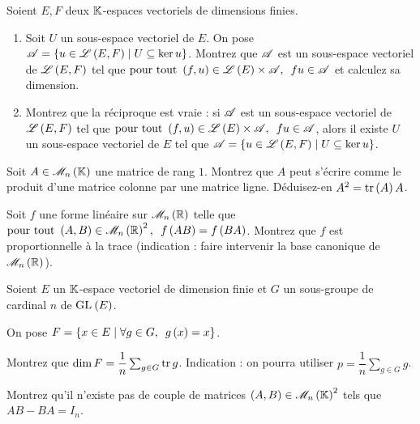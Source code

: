 \begin{exoss}[Exercice 20]
Soient \(E,F\) deux \(\mathbb{K}\)-espaces vectoriels de dimensions finies.

\begin{enumerate}
    \item Soit \(U\) un sous-espace vectoriel de \(E\). On pose \(\mathscr{A}=\left\lbrace u\in\mathscr{L}\left(E,F\right)\;\middle|\; U\subseteq\ker u\right\rbrace\). Montrez que \(\mathscr{A}\) est un sous-espace vectoriel de \(\mathscr{L}\left(E,F\right)\) tel que \(\quantifs{\tpt\paren{f,u}\in\Lendo{E}\times\fami{A}}fu\in\fami{A}\) et calculez sa dimension. \\
    \item Montrez que la réciproque est vraie : si \(\mathscr{A}\) est un sous-espace vectoriel de \(\mathscr{L}\left(E,F\right)\) tel que \(\quantifs{\tpt\paren{f,u}\in\Lendo{E}\times\fami{A}}fu\in\fami{A}\), alors il existe \(U\) un sous-espace vectoriel de \(E\) tel que \(\mathscr{A}=\left\lbrace u\in\mathscr{L}\left(E,F\right)\;\middle|\; U\subseteq\ker u\right\rbrace\).
\end{enumerate}
\end{exoss}



\begin{exops}[Exercice 21]
Soit \(A\in\M{n}\) une matrice de rang \(1\). Montrez que \(A\) peut s'écrire comme le produit d'une matrice colonne par une matrice ligne. Déduisez-en \(A^2=\operatorname{tr}\left(A\right)A\).
\end{exops}



\begin{exopss}[Exercice 22]
Soit \(f\) une forme linéaire sur \(\M{n}[\R]\) telle que \(\quantifs{\tpt\paren{A,B}\in\M{n}[\R]^2}f\paren{AB}=f\paren{BA}\). Montrez que \(f\) est proportionnelle à la trace (indication : faire intervenir la base canonique de \(\M{n}[\R]\)).
\end{exopss}



\begin{exosss}[Exercice 23]
Soient \(E\) un \(\mathbb{K}\)-espace vectoriel de dimension finie et \(G\) un sous-groupe de cardinal \(n\) de \(\GL{}[E]\).

On pose \(F=\accol{x\in E\tq\quantifs{\forall g\in G}g\paren{x}=x}\).

Montrez que \(\dim F=\dfrac{1}{n}\sum_{g\in G}\operatorname{tr} g\). Indication : on pourra utiliser \(p=\dfrac{1}{n}\sum_{g\in G}g\).
\end{exosss}



\begin{exos}[Exercice 24]
Montrez qu'il n'existe pas de couple de matrices \(\paren{A,B}\in\M{n}^2\) tels que \(AB-BA=I_n\).
\end{exos}



